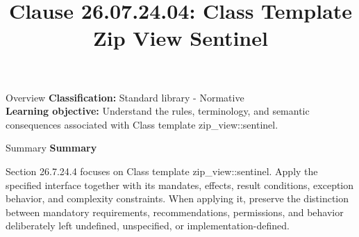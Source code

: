 \documentclass[10pt,letterpaper]{article}
\title{Clause 26.07.24.04: Class Template Zip View Sentinel}
\author{}
\date{}
\begin{document}
\maketitle
\begin{CornellOverviewBox}{Overview}
\textbf{Classification:} Standard library - Normative\\[2pt]
\textbf{Learning objective:} Understand the rules, terminology, and semantic consequences associated with Class template zip\_view::sentinel.
\end{CornellOverviewBox}\begin{CornellSummaryBox}{Summary}
{\sffamily\bfseries\color{Accent} Summary}\par\vspace{3pt}Section 26.7.24.4 focuses on Class template zip\_view::sentinel. Apply the specified interface together with its mandates, effects, result conditions, exception behavior, and complexity constraints. When applying it, preserve the distinction between mandatory requirements, recommendations, permissions, and behavior deliberately left undefined, unspecified, or implementation-defined.
\end{CornellSummaryBox}
\end{document}
